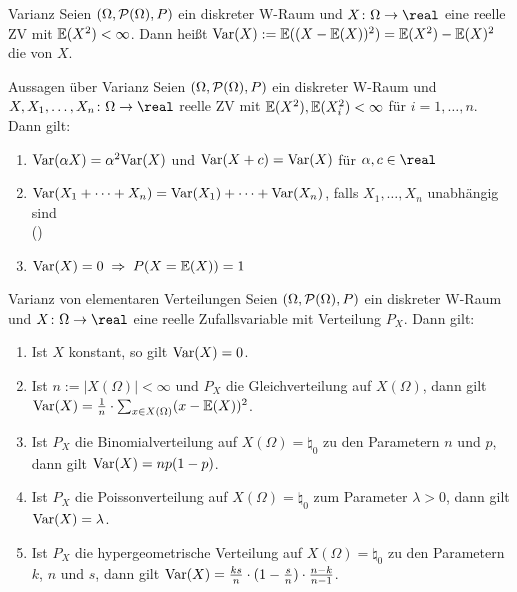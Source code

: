 \begin{Def}{Varianz}
    Seien $(\Omega, \P(\Omega), P)$ ein diskreter W-Raum und
    $X\colon \Omega \rightarrow \real$ eine reelle ZV mit $\EW(X^2) < \infty$.
    Dann heißt $\Var(X) := \EW((X - \EW(X))^2) = \EW(X^2) - \EW(X)^2$
    die  von $X$.
\end{Def}

\begin{Satz}{Aussagen über Varianz}
    Seien $(\Omega, \P(\Omega), P)$ ein diskreter W-Raum und\\
    $X, X_1, \dotsc, X_n\colon \Omega \rightarrow \real$ reelle ZV mit
    $\EW(X^2), \EW(X_i^2) < \infty$ für $i = 1, \dotsc, n$.
    Dann gilt:
    \begin{enumerate}
        \item
        $\Var(\alpha X) = \alpha^2 \Var(X)$ und
        $\Var(X + c) = \Var(X)$ für $\alpha, c \in \real$

        \item
        $\Var(X_1 + \dotsb + X_n) = \Var(X_1) + \dotsb + \Var(X_n)$,
        falls $X_1, \dotsc, X_n$ unabhängig sind\\
        ()

        \item
        $\Var(X) = 0 \;\Rightarrow\; P(X = \EW(X)) = 1$
    \end{enumerate}
\end{Satz}

\linie

\begin{Satz}{Varianz von elementaren Verteilungen}
    Seien $(\Omega, \P(\Omega), P)$ ein diskreter W-Raum und
    $X\colon \Omega \rightarrow \real$ eine reelle Zufallsvariable mit Verteilung $P_X$.
    Dann gilt:
    \begin{enumerate}
        \item
        Ist $X$ konstant, so gilt $\Var(X) = 0$.

        \item
        Ist $n := |X(\Omega)| < \infty$ und $P_X$ die Gleichverteilung auf $X(\Omega)$, dann gilt\\
        $\Var(X) = \frac{1}{n} \cdot \sum_{x \in X(\Omega)} (x - \EW(X))^2$.

        \item
        Ist $P_X$ die Binomialverteilung auf $X(\Omega) = \natural_0$
        zu den Parametern $n$ und $p$, dann gilt $\Var(X) = np(1 - p)$.

        \item
        Ist $P_X$ die Poissonverteilung auf $X(\Omega) = \natural_0$ zum Parameter $\lambda > 0$,
        dann gilt $\Var(X) = \lambda$.

        \item
        Ist $P_X$ die hypergeometrische Verteilung auf $X(\Omega) = \natural_0$ zu den Parametern
        $k$, $n$ und $s$, dann gilt
        $\Var(X) = \frac{ks}{n} \cdot (1 - \frac{s}{n}) \cdot \frac{n - k}{n - 1}$.
    \end{enumerate}
\end{Satz}

